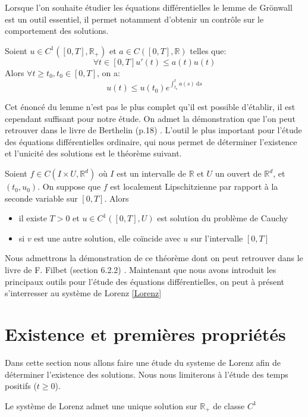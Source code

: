 \documentclass{article}
\newcommand{\R}{\mathbb{R}}
\newtheorem[M , nocut]{prop}{Proposition}[section]
\newtheorem[M , nocut]{definition}{Définition}
\newtheorem[M , nocut]{lemme}{Lemme}
\newtheorem[L , nocut]{thm}{Théoreme}
\newtheorem[M , nocut]{cor}{Corollaire}
\begin{document}
Lorsque l'on souhaite étudier les équations différentielles le lemme de Grönwall est un outil essentiel, il permet notamment d'obtenir un contrôle sur le comportement des solutions.
\begin{lemme}
    \label{lemme:Gronwall}
    Soient $u\in C^1([0,T],\R_+)$ et $a\in C([0,T],\R)$ telles que:
    \[
      \forall t \in [0,T] u'(t)\le a(t)u(t)  
    \]Alors $\forall t \ge t_0, t_0 \in [0,T]$, on a:
    \[
        u(t) \le u(t_0)e^{\int_{t_o}^t a(s)\ \mathrm{d}s}
    \]
\end{lemme}
Cet énoncé du lemme n'est pas le plus complet qu'il est possible d'établir, il est cependant suffisant pour notre étude. On admet la démonstration que l'on peut retrouver dans le livre de Berthelin (p.18) \cite{florent_berthelin_equations_2021}.
L'outil le plus important pour l'étude des équations différentielles ordinaire, qui nous permet de déterminer l'existence et l'unicité des solutions est le théorème suivant.
\begin{thm}
    \label{thm:CL}
    Soient $f\in C(I\times U, \R^d)$ où $I$ est un intervalle de $\R$ et $U$ un ouvert de $\R^d$, et $(t_0,u_0)$. On suppose que $f$ est localement Lipschitzienne par rapport à la seconde variable sur $[0,T]$. Alors 
    \begin{itemize}
        \item il existe $T>0$ et $u\in C^1([0,T],U)$ est solution du problème de Cauchy
        \item si $v$ est une autre solution, elle coïncide avec $u$ sur l'intervalle $[0,T]$
    \end{itemize}
\end{thm}
Nous admettrons la démonstration de ce théorème dont on peut retrouver dans le livre de F. Filbet (section 6.2.2) \cite{francis_filbet_analyse_2009}.
Maintenant que nous avons introduit les principaux outils pour l'étude des équations différentielles, on peut à présent s'interresser au système de Lorenz \eqref{Lorenz}

\newpage
\section{Existence et premières propriétés}

Dans cette section nous allons faire une étude du systeme de Lorenz afin de déterminer l'existence des solutions. Nous nous limiterons à l'étude des temps positifs ($t \ge 0$).

\begin{prop}
    Le système de Lorenz admet une unique solution sur $\R_+$ de classe $C^1$
\end{prop}
\end{document}
